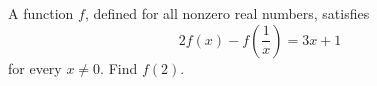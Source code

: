 A function $f$, defined for all nonzero real numbers, satisfies
\[
2f(x)-f\left(\dfrac{1}{x}\right)=3x+1
\]
for every $x\ne0$. Find $f(2)$.
